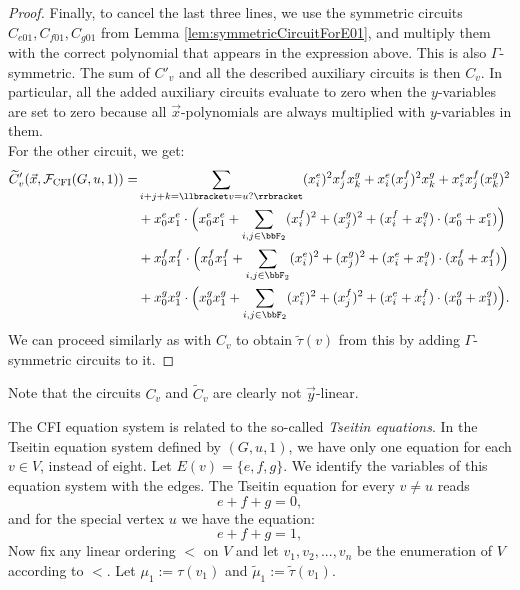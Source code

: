\documentclass[10pt,a4paper]{article}
\newcommand{\Ff}{{\cal F}}
\newcommand{\CFI}{\Ff_{\mathrm{CFI}}}
\newcommand{\tautilde}{\tilde{\tau}}
\newcommand{\mutilde}{\tilde{\mu}}
\begin{document}
\begin{proof}
	Finally, to cancel the last three lines, we use the symmetric circuits $C_{e01}, C_{f01}, C_{g01}$ from Lemma \ref{lem:symmetricCircuitForE01}, and multiply them with the correct polynomial that appears in the expression above. This is also $\Gamma$-symmetric. The sum of $C'_v$ and all the described auxiliary circuits is then $C_v$. In particular, all the added auxiliary circuits evaluate to zero when the $y$-variables are set to zero because all $\vec x$-polynomials are always multiplied with $y$-variables in them.\\
	
	For the other circuit, we get:
	\begin{align*}
		\widetilde{C}'_v(\vec x, \CFI(G, u, 1)) =  &\sum_{i+j+k = \llbracket v = u? \rrbracket} (x^e_i)^2x^f_jx^g_k + x^e_i(x^f_j)^2x^g_k + x^e_ix^f_j(x^g_k)^2\\
		&+x^e_0x^e_1 \cdot \Big(x^e_0x^e_1+\sum_{i,j \in \bbF_2} (x^f_i)^2+(x^g_j)^2 +  (x_i^f+ x_i^g) \cdot (x_0^e + x_1^e) \Big)\\
		&+x^f_0x^f_1\cdot \Big(x^f_0x^f_1+\sum_{i,j \in \bbF_2} (x^e_i)^2+(x^g_j)^2 +  (x_i^e+ x_i^g) \cdot (x_0^f + x_1^f) \Big)\\
		&+ x^g_0x^g_1 \cdot \Big(x^g_0x^g_1+\sum_{i,j \in \bbF_2} (x^e_i)^2+(x^f_j)^2 +  (x_i^e+ x_i^f) \cdot (x_0^g + x_1^g) \Big). 
	\end{align*}
	We can proceed similarly as with $C_v$ to obtain $\tautilde(v)$ from this by adding $\Gamma$-symmetric circuits to it.
\end{proof}	
Note that the circuits $C_v$ and $\widetilde{C}_v$ are clearly not $\vec y$-linear.

The CFI equation system is related to the so-called \emph{Tseitin equations}. In the Tseitin equation system defined by $(G,u,1)$, we have only one equation for each $v \in V$, instead of eight. Let $E(v) = \{e,f,g\}$. We identify the variables of this equation system with the edges. The Tseitin equation for every $v \neq u$ reads
\[
e+f+g = 0,
\] 
and for the special vertex $u$ we have the equation:
\[
e+f+g = 1,
\] 
Now fix any linear ordering $<$ on $V$ and let $v_1,v_2,...,v_n$ be the enumeration of $V$ according to $<$. Let $\mu_1 := \tau(v_1)$ and $\mutilde_1 := \tautilde(v_1)$.\\ 
\end{document}
